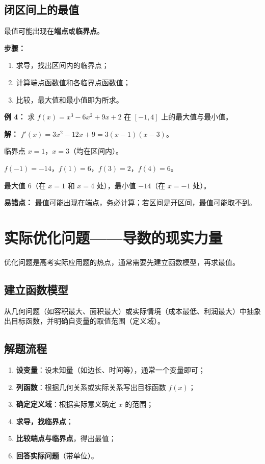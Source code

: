 \documentclass[10pt]{article}
\begin{document}
\subsection{闭区间上的最值}
最值可能出现在\textbf{端点}或\textbf{临界点}。

\textbf{步骤：}
\begin{enumerate}
    \item 求导，找出区间内的临界点；
    \item 计算端点函数值和各临界点函数值；
    \item 比较，最大值和最小值即为所求。
\end{enumerate}

\textbf{例 4：} 求 $f(x)=x^3-6x^2+9x+2$ 在 $[-1,4]$ 上的最大值与最小值。

\textbf{解：} $f'(x)=3x^2-12x+9=3(x-1)(x-3)$。

临界点 $x=1$，$x=3$（均在区间内）。

$f(-1)=-14$，$f(1)=6$，$f(3)=2$，$f(4)=6$。

最大值 $6$（在 $x=1$ 和 $x=4$ 处），最小值 $-14$（在 $x=-1$ 处）。

\textbf{易错点：} 最值可能出现在端点，务必计算；若区间是开区间，最值可能取不到。

\section{实际优化问题——导数的现实力量}
优化问题是高考实际应用题的热点，通常需要先建立函数模型，再求最值。

\subsection{建立函数模型}
从几何问题（如容积最大、面积最大）或实际情境（成本最低、利润最大）中抽象出目标函数，并明确自变量的取值范围（定义域）。

\subsection{解题流程}
\begin{enumerate}
    \item \textbf{设变量}：设未知量（如边长、时间等），通常一个变量即可；
    \item \textbf{列函数}：根据几何关系或实际关系写出目标函数 $f(x)$；
    \item \textbf{确定定义域}：根据实际意义确定 $x$ 的范围；
    \item \textbf{求导，找临界点}；
    \item \textbf{比较端点与临界点}，得出最值；
    \item \textbf{回答实际问题}（带单位）。
\end{enumerate}
\end{document}

